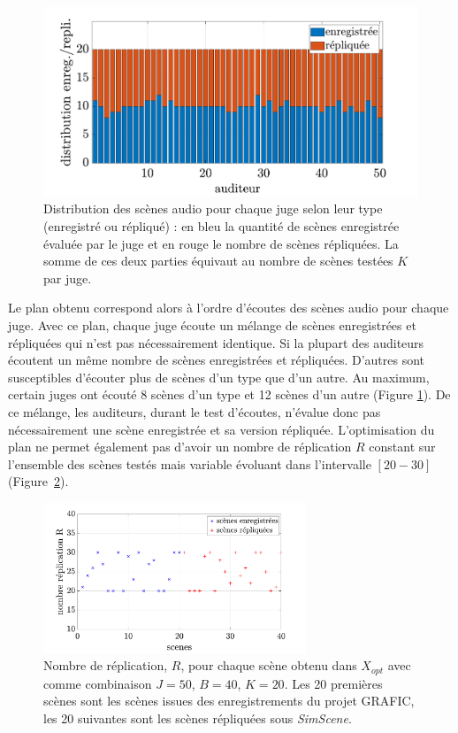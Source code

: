 \begin{figure}[h]
\centering
\includegraphics[width=.7\linewidth]{./figures/test_perceptif/repartition-real-simulated.pdf}
\caption{Distribution des scènes audio pour chaque juge selon leur type (enregistré ou répliqué) : en bleu la quantité de scènes enregistrée évaluée par le juge et en rouge le nombre de scènes répliquées. La somme de ces deux parties équivaut au nombre de scènes testées $K$ par juge.}
\label{fig:repartitionScene}
\end{figure}

Le plan obtenu correspond alors à l'ordre d'écoutes des scènes audio pour chaque juge. Avec ce plan, chaque juge écoute un mélange de scènes enregistrées et répliquées qui n'est pas nécessairement identique. Si la plupart des auditeurs écoutent un même nombre de scènes enregistrées et répliquées. D'autres sont susceptibles d'écouter plus de scènes d'un type que d'un autre. Au maximum, certain juges ont écouté 8 scènes d'un type et 12 scènes d'un autre (Figure \ref{fig:repartitionScene}). 
De ce mélange, les auditeurs, durant le test d'écoutes, n'évalue donc pas nécessairement une scène enregistrée et sa version répliquée. 
L'optimisation du plan ne permet également pas d'avoir un nombre de réplication $R$ constant sur l'ensemble des scènes testés mais variable évoluant dans l'intervalle $\left[20-30 \right]$ (Figure~\ref{fig:replication}). \\


\begin{figure}[ht]
\centering
\includegraphics[width = 0.7\textwidth]{./figures/test_perceptif/nb_replication.pdf}
\caption{Nombre de réplication, $R$, pour chaque scène obtenu dans $X_{opt}$ avec comme combinaison $J = 50$, $B = 40$, $K = 20$. Les 20 premières scènes sont les scènes issues des enregistrements du projet GRAFIC, les 20 suivantes sont les scènes répliquées sous \textit{SimScene}.}
\label{fig:replication}
\end{figure}

